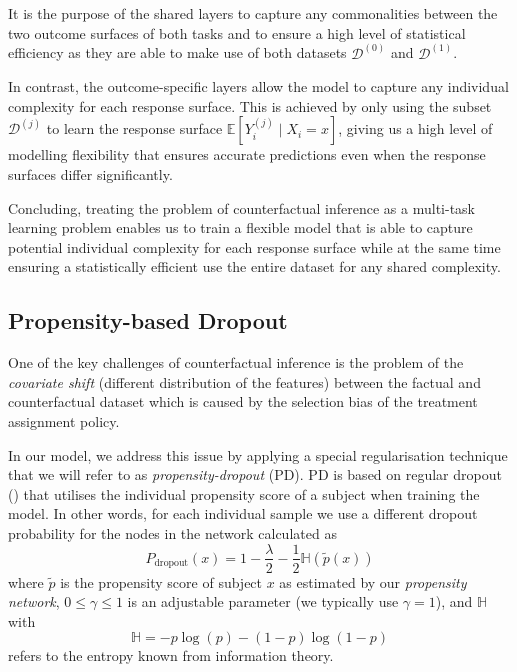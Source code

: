 It is the purpose of the shared layers to capture any commonalities between the two outcome surfaces of both tasks and to ensure a high level of statistical efficiency as they are able to make use of both datasets $\mathcal{D}^{(0)}$ and $\mathcal{D}^{(1)}$. 

In contrast, the outcome-specific layers allow the model to capture any individual complexity for each response surface. This is achieved by only using the subset $\mathcal{D}^{(j)}$ to learn the response surface $\mathbb{E}[Y_i^{(j)} \mid X_i = x]$, giving us a high level of modelling flexibility that ensures accurate predictions even when the response surfaces differ significantly. 

Concluding, treating the problem of counterfactual inference as a multi-task learning problem enables us to train a flexible model that is able to capture potential individual complexity for each response surface while at the same time ensuring a statistically efficient use the entire dataset for any shared complexity. 
	
\subsection{Propensity-based Dropout} \label{sec:propensity-based-dropout}
One of the key challenges of counterfactual inference is the problem of the \emph{covariate shift} (different distribution of the features) between the factual and counterfactual dataset which is caused by the selection bias of the treatment assignment policy.

In our model, we address this issue by applying a special regularisation technique that we will refer to as \emph{propensity-dropout} (PD). PD is based on regular dropout (\cite{dropout})
that utilises the individual propensity score of a subject when training the model. In other words, for each individual sample we use a different dropout probability for the nodes in the network calculated as
\begin{equation}
P_{\text{dropout}}(x) = 1 - \frac{\lambda}{2} - \frac{1}{2} \mathbb{H}(\tilde{p}(x))
\end{equation}
where $\tilde{p}$ is the propensity score of subject $x$ as estimated by our \emph{propensity network}, $0 \leq \gamma \leq 1$ is an adjustable parameter (we typically use $\gamma = 1$), and $\mathbb{H}$ with
\begin{equation}
\mathbb{H} = -p \log (p) - (1-p)\log (1-p)
\end{equation}
refers to the entropy %
known from information theory. 

